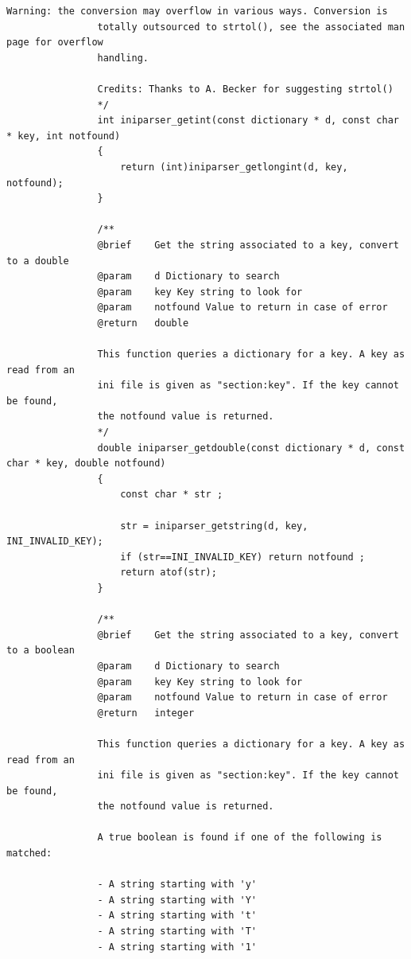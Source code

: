 \documentclass{article}
\begin{document}
\begin{Verbatim}[gobble=8]
                Warning: the conversion may overflow in various ways. Conversion is
                totally outsourced to strtol(), see the associated man page for overflow
                handling.
                
                Credits: Thanks to A. Becker for suggesting strtol()
                */
                int iniparser_getint(const dictionary * d, const char * key, int notfound)
                {
                    return (int)iniparser_getlongint(d, key, notfound);
                }
                
                /**
                @brief    Get the string associated to a key, convert to a double
                @param    d Dictionary to search
                @param    key Key string to look for
                @param    notfound Value to return in case of error
                @return   double
                
                This function queries a dictionary for a key. A key as read from an
                ini file is given as "section:key". If the key cannot be found,
                the notfound value is returned.
                */
                double iniparser_getdouble(const dictionary * d, const char * key, double notfound)
                {
                    const char * str ;
                
                    str = iniparser_getstring(d, key, INI_INVALID_KEY);
                    if (str==INI_INVALID_KEY) return notfound ;
                    return atof(str);
                }
                
                /**
                @brief    Get the string associated to a key, convert to a boolean
                @param    d Dictionary to search
                @param    key Key string to look for
                @param    notfound Value to return in case of error
                @return   integer
                
                This function queries a dictionary for a key. A key as read from an
                ini file is given as "section:key". If the key cannot be found,
                the notfound value is returned.
                
                A true boolean is found if one of the following is matched:
                
                - A string starting with 'y'
                - A string starting with 'Y'
                - A string starting with 't'
                - A string starting with 'T'
                - A string starting with '1'
                

\end{Verbatim}
\end{document}
